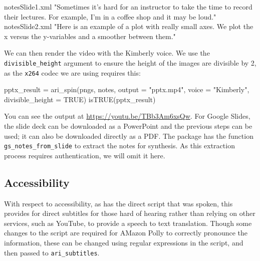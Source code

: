 \begin{Schunk}
\begin{Soutput}
                                                                                                                          notesSlide1.xml 
"Sometimes it’s hard for an instructor to take the time to record their lectures.  For example, I’m in a coffee shop and it may be loud." 
                                                                                                                          notesSlide2.xml 
                "Here is an example of a plot with really small axes.  We plot the x versus the y-variables and a smoother between them." 
\end{Soutput}
\end{Schunk}

We can then render the video with the Kimberly voice. We use the
\texttt{divisible\_height} argument to ensure the height of the images
are divisible by 2, as the \texttt{x264} codec we are using requires
this:

\begin{Schunk}
\begin{Sinput}
pptx_result = ari_spin(pngs, notes, output = "pptx.mp4", voice = "Kimberly",
    divisible_height = TRUE)
isTRUE(pptx_result)
\end{Sinput}
\end{Schunk}

You can see the output at \url{https://youtu.be/TBb3Am6xsQw}. For Google
Slides, the slide deck can be downloaded as a PowerPoint and the
previous steps can be used; it can also be downloaded directly as a PDF.
The  package has the function
\texttt{gs\_notes\_from\_slide} to extract the notes for synthesis. As
this extraction process requires authentication, we will omit it here.

\hypertarget{accessibility}{%
\subsection{Accessibility}\label{accessibility}}

With respect to accessibility, as  has the direct script that
was spoken, this provides for direct subtitles for those hard of hearing
rather than relying on other services, such as YouTube, to provide a
speech to text translation. Though some changes to the script are
required for AMazon Polly to correctly pronounce the information, these
can be changed using regular expressions in the script, and then passed
to \texttt{ari\_subtitles}.

